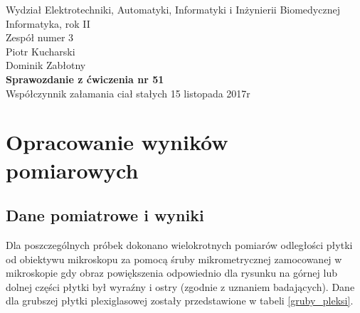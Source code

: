 \documentclass[a4paper,12pts]{article}
\begin{document}
	\thispagestyle{empty}
	\begin{flushleft}
		Wydział Elektrotechniki, Automatyki, Informatyki i Inżynierii Biomedycznej \\
		Informatyka, rok II \\
		Zespół numer 3 \\
		Piotr Kucharski \\
		Dominik Zabłotny \\
		\vspace*{\fill}
		{\large \textbf{Sprawozdanie z ćwiczenia nr 51} } \\
		Współczynnik załamania ciał stałych		
		\vfill	
		15 listopada 2017r
	\end{flushleft}
	
	\newpage
	
	
	\section{Opracowanie wyników pomiarowych}
	\subsection{Dane pomiatrowe i wyniki}
	Dla poszczególnych próbek dokonano wielokrotnych pomiarów odległości płytki od obiektywu mikroskopu za pomocą śruby mikrometrycznej zamocowanej w mikroskopie gdy obraz powiększenia odpowiednio dla rysunku na górnej lub dolnej części płytki był wyraźny i ostry (zgodnie z uznaniem badających). Dane dla grubszej płytki plexiglasowej zostały przedstawione w tabeli \ref{gruby_pleksi}.
	
\end{document}

